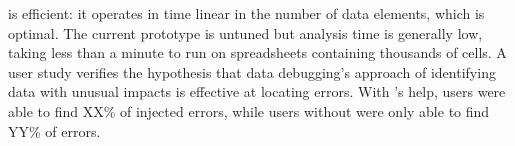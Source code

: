 \checkcell{} is efficient: it operates in time linear in the number
of data elements, which is optimal. The current prototype is untuned
but analysis time is generally low, taking less than a minute to run
on spreadsheets containing thousands of cells. A user study verifies
the hypothesis that data debugging's approach of identifying data with
unusual impacts is effective at locating errors. With \checkcell{}'s
help, users were able to find XX\% of injected errors, while users
without \checkcell{} were only able to find YY\% of errors.

